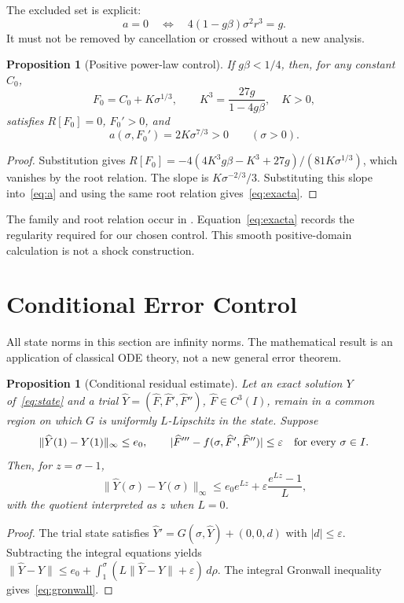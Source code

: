 \documentclass[11pt,a4paper]{article}
\newtheorem{proposition}[theorem]{Proposition}
\theoremstyle{definition}
\theoremstyle{remark}
\begin{document}
The excluded set is explicit:
\begin{equation}
a=0\quad\Longleftrightarrow\quad
4(1-g\beta)\sigma^2r^3=g.
\label{eq:rankdrop}
\end{equation}
It must not be removed by cancellation or crossed without a new analysis.

\begin{proposition}[Positive power-law control]\label{prop:control}
If $g\beta<1/4$, then, for any constant $C_0$,
\[
F_0=C_0+K\sigma^{1/3},\qquad K^3=\frac{27g}{1-4g\beta},\quad K>0,
\]
satisfies $R[F_0]=0$, $F_0'>0$, and
\begin{equation}
a(\sigma,F_0')=2K\sigma^{7/3}>0\qquad(\sigma>0).
\label{eq:exacta}
\end{equation}
\end{proposition}
\begin{proof}
Substitution gives
$R[F_0]=-4(4K^3g\beta-K^3+27g)/(81K\sigma^{1/3})$,
which vanishes by the root relation. The slope is
$K\sigma^{-2/3}/3$. Substituting this slope into~\eqref{eq:a}
and using the same root relation gives~\eqref{eq:exacta}.
\end{proof}
The family and root relation occur in \cite[Section 3.4]{lagrange}.
Equation~\eqref{eq:exacta} records the regularity required for our chosen control. This smooth positive-domain calculation is not a shock construction.

\section{Conditional Error Control}\label{sec:theory}
All state norms in this section are infinity norms. The mathematical result is an application of classical ODE theory, not a new general error theorem.

\begin{proposition}[Conditional residual estimate]\label{prop:gronwall}
Let an exact solution $Y$ of~\eqref{eq:state} and a trial
$\widehat Y=(\widehat F,\widehat F',\widehat F'')$, $\widehat F\in C^3(I)$,
remain in a common region on which $G$ is uniformly $L$-Lipschitz in the state. Suppose
\[
\|\widehat Y(1)-Y(1)\|_\infty\le e_0,\qquad
|\widehat F'''-f(\sigma,\widehat F',\widehat F'')|\le\varepsilon
\quad\hbox{for every }\sigma\in I.
\]
Then, for $z=\sigma-1$,
\begin{equation}
\|\widehat Y(\sigma)-Y(\sigma)\|_\infty
\le e_0e^{Lz}+\varepsilon\frac{e^{Lz}-1}{L},
\label{eq:gronwall}
\end{equation}
with the quotient interpreted as $z$ when $L=0$.
\end{proposition}
\begin{proof}
The trial state satisfies $\widehat Y'=G(\sigma,\widehat Y)+(0,0,d)$ with $|d|\le\varepsilon$. Subtracting the integral equations yields
$\|\widehat Y-Y\|\le e_0+\int_1^\sigma(L\|\widehat Y-Y\|+\varepsilon)\,d\rho$.
The integral Gronwall inequality gives~\eqref{eq:gronwall}.
\end{proof}
\end{document}
